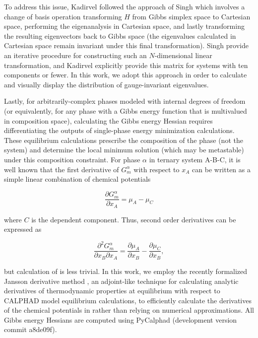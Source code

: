 To address this issue, Kadirvel \etal \cite{kadirvel2022exploration} followed the approach of Singh \etal \cite{singh2015atomic} which involves a change of basis operation transforming $H$ from Gibbs simplex space to Cartesian space, performing the eigenanalysis in Cartesian space, and lastly transforming the resulting eigenvectors back to Gibbs space (the eigenvalues calculated in Cartesian space remain invariant under this final transformation). Singh \etal \cite{singh2015atomic} provide an iterative procedure for constructing such an $N$-dimensional linear transformation, and Kadirvel \etal \cite{kadirvel2022exploration} explicitly provide this matrix for systems with ten components or fewer. In this work, we adopt this approach in order to calculate and visually display the distribution of gauge-invariant eigenvalues. 

Lastly, for arbitrarily-complex phases modeled with internal degrees of freedom (or equivalently, for any phase with a Gibbs energy function that is multivalued in composition space), calculating the Gibbs energy Hessian requires differentiating the outputs of single-phase energy minimization calculations. These equilibrium calculations prescribe the composition of the phase (not the system) and determine the local minimum solution (which may be metastable) under this composition constraint. For phase $\alpha$ in ternary system A-B-C, it is well known that the first derivative of $G^\alpha_m$ with respect to $x_A$ can be written as a simple linear combination of chemical potentials

\begin{equation}\label{eq:first_derivative}
\frac{\partial G^\alpha_m}{\partial x_A}=\mu_A-\mu_C
\end{equation}

\noindent where $C$ is the dependent component. Thus, second order derivatives can be expressed as 

\begin{equation}\label{eq:second_derivatives}
    \frac{\partial^2G^\alpha_m}{\partial x_B\partial x_A} = \frac{\partial \mu_A}{\partial x_B} - \frac{\partial \mu_C}{\partial x_B},
\end{equation}

\noindent but calculation of  is less trivial. In this work, we employ the recently formalized Jansson derivative method \cite{kunselman2024analytically}, an adjoint-like technique for calculating analytic derivatives of thermodynamic properties at equilibrium with respect to CALPHAD model equilibrium calculations, to efficiently calculate the derivatives of the chemical potentials in  rather than relying on numerical approximations. All Gibbs energy Hessians are computed using PyCalphad \cite{otis2017pycalphad} (development version commit a8de09f).

